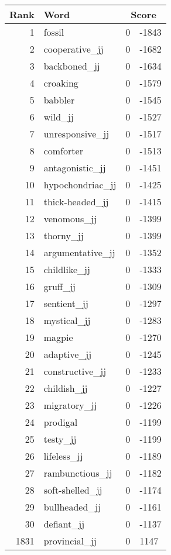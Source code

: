 \begin{longtable}[!htbp]{| rlr@{.}l |}
    \hline
    \textbf{Rank} & \textbf{Word} & \multicolumn{2}{c|}{\textbf{Score}} \\
    \hline
    \endhead
    1 & fossil & 0 & -1843 \\
    2 & cooperative\_jj & 0 & -1682 \\
    3 & backboned\_jj & 0 & -1634 \\
    4 & croaking & 0 & -1579 \\
    5 & babbler & 0 & -1545 \\
    6 & wild\_jj & 0 & -1527 \\
    7 & unresponsive\_jj & 0 & -1517 \\
    8 & comforter & 0 & -1513 \\
    9 & antagonistic\_jj & 0 & -1451 \\
    10 & hypochondriac\_jj & 0 & -1425 \\
    11 & thick-headed\_jj & 0 & -1415 \\
    12 & venomous\_jj & 0 & -1399 \\
    13 & thorny\_jj & 0 & -1399 \\
    14 & argumentative\_jj & 0 & -1352 \\
    15 & childlike\_jj & 0 & -1333 \\
    16 & gruff\_jj & 0 & -1309 \\
    17 & sentient\_jj & 0 & -1297 \\
    18 & mystical\_jj & 0 & -1283 \\
    19 & magpie & 0 & -1270 \\
    20 & adaptive\_jj & 0 & -1245 \\
    21 & constructive\_jj & 0 & -1233 \\
    22 & childish\_jj & 0 & -1227 \\
    23 & migratory\_jj & 0 & -1226 \\
    24 & prodigal & 0 & -1199 \\
    25 & testy\_jj & 0 & -1199 \\
    26 & lifeless\_jj & 0 & -1189 \\
    27 & rambunctious\_jj & 0 & -1182 \\
    28 & soft-shelled\_jj & 0 & -1174 \\
    29 & bullheaded\_jj & 0 & -1161 \\
    30 & defiant\_jj & 0 & -1137 \\
    1831 & provincial\_jj & 0 & 1147 \\

\end{longtable}
